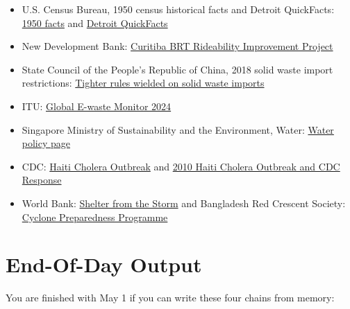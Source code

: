 \documentclass[11pt,a4paper]{article}
\begin{document}
\begin{itemize}
  \item U.S. Census Bureau, 1950 census historical facts and Detroit
  QuickFacts: \href{https://www.census.gov/about/history/historical-censuses-and-surveys/decade-facts.1950.html}{1950 facts}
  and \href{https://www.census.gov/quickfacts/fact/table/detroitcitymichigan/POP645223}{Detroit QuickFacts}
  \item New Development Bank:
  \href{https://www.ndb.int/project/brazil-curitibas-bus-rapid-transit-rideability-improvement-project/}{Curitiba BRT Rideability Improvement Project}
  \item State Council of the People's Republic of China, 2018 solid waste
  import restrictions:
  \href{https://english.www.gov.cn/policies/policy_watch/2018/02/05/content_281476036805432.htm}{Tighter rules wielded on solid waste imports}
  \item ITU:
  \href{https://www.itu.int/en/ITU-D/Environment/Pages/Publications/The-Global-E-waste-Monitor-2024.aspx}{Global E-waste Monitor 2024}
  \item Singapore Ministry of Sustainability and the Environment, Water:
  \href{https://www.mse.gov.sg/policies/water/}{Water policy page}
  \item CDC:
  \href{https://www.cdc.gov/orr/responses/haiti-cholera-outbreak.html}{Haiti Cholera Outbreak}
  and
  \href{https://archive.cdc.gov/www_cdc_gov/cholera/haiti/2010-outbreak-response.html}{2010 Haiti Cholera Outbreak and CDC Response}
  \item World Bank:
  \href{https://www.worldbank.org/en/results/2022/08/29/shelter-from-the-storm-protecting-bangladesh-s-coastal-communities-from-natural-disasters}{Shelter from the Storm}
  and Bangladesh Red Crescent Society:
  \href{https://bdrcs.org/cyclone-preparedness-programm-cpp/}{Cyclone Preparedness Programme}
\end{itemize}

\section{End-Of-Day Output}

You are finished with May 1 if you can write these four chains from memory:
\end{document}

